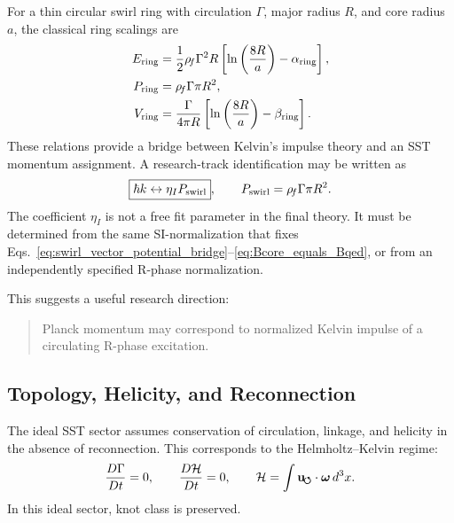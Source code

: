     For a thin circular swirl ring with circulation \(\Gamma\), major radius
    \(R\), and core radius \(a\), the classical ring scalings are
    \begin{align}
        E_{\rm ring}
        &=
        \frac{1}{2}\rho_{\!f}\Gamma^2 R
        \left[
            \ln\left(\frac{8R}{a}\right)-\alpha_{\rm ring}
        \right],
        \label{eq:ring_energy}
        \\
        P_{\rm ring}
        &=
        \rho_{\!f}\Gamma\pi R^2,
        \label{eq:ring_impulse}
        \\
        V_{\rm ring}
        &=
        \frac{\Gamma}{4\pi R}
        \left[
            \ln\left(\frac{8R}{a}\right)-\beta_{\rm ring}
        \right].
        \label{eq:ring_velocity}
    \end{align}
    These relations provide a bridge between Kelvin's impulse theory and an
    SST momentum assignment.  A research-track identification may be written
    as
    \begin{equation}
        \boxed{
            \hbar k
            \leftrightarrow
            \eta_I P_{\rm swirl}
        },
        \qquad
        P_{\rm swirl}
        =
        \rho_{\!f}\Gamma\pi R^2.
        \label{eq:hbar_k_kelvin_impulse_bridge}
    \end{equation}
    The coefficient \(\eta_I\) is not a free fit parameter in the final
    theory.  It must be determined from the same SI-normalization that fixes
    Eqs.~\eqref{eq:swirl_vector_potential_bridge}--\eqref{eq:Bcore_equals_Bqed},
    or from an independently specified R-phase normalization.
    
    This suggests a useful research direction:
    
    \begin{quote}
        Planck momentum may correspond to normalized Kelvin impulse of a circulating
        R-phase excitation.
    \end{quote}

\subsection{Topology, Helicity, and Reconnection}
    
    The ideal SST sector assumes conservation of circulation, linkage, and
    helicity in the absence of reconnection.  This corresponds to the
    Helmholtz--Kelvin regime:
    \begin{equation}
        \frac{D\Gamma}{Dt}=0,
        \qquad
        \frac{D\mathcal{H}}{Dt}=0,
        \qquad
        \mathcal{H}
        =
        \int
        \mathbf{u}_{\!\boldsymbol{\circlearrowleft}}\cdot\boldsymbol{\omega}\,d^3x.
        \label{eq:helicity_conservation}
    \end{equation}
    In this ideal sector, knot class is preserved.
    

